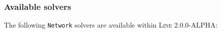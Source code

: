 \subsubsection{Available solvers}
\noindent The following \texttt{Network} solvers are available within \textsc{Line} 2.0.0-ALPHA:
